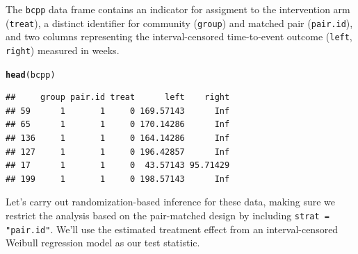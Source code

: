 \documentclass[12pt]{article}\usepackage[]{graphicx}\usepackage[]{color}
\makeatletter
\newcommand{\hlstd}[1]{\textcolor[rgb]{0.345,0.345,0.345}{#1}}%
\newcommand{\hlkwd}[1]{\textcolor[rgb]{0.737,0.353,0.396}{\textbf{#1}}}%
\newenvironment{kframe}{%
 \def\at@end@of@kframe{}%
 \ifinner\ifhmode%
  \def\at@end@of@kframe{\end{minipage}}%
  \begin{minipage}{\columnwidth}%
 \fi\fi%
 \def\FrameCommand##1{\hskip\@totalleftmargin \hskip-\fboxsep
 \colorbox{shadecolor}{##1}\hskip-\fboxsep
     \hskip-\linewidth \hskip-\@totalleftmargin \hskip\columnwidth}%
 \MakeFramed {\advance\hsize-\width
   \@totalleftmargin\z@ \linewidth\hsize
   \@setminipage}}%
 {\par\unskip\endMakeFramed%
 \at@end@of@kframe}
\newenvironment{knitrout}{}{} %
\makeatother
\begin{document}
The \texttt{bcpp} data frame contains an indicator for assigment to the intervention arm (\texttt{treat}), a distinct identifier for community (\texttt{group}) and matched pair (\texttt{pair.id}), and two columns representing the interval-censored time-to-event outcome (\texttt{left}, \texttt{right}) measured in weeks.
\begin{knitrout}
\color{fgcolor}\begin{kframe}
\begin{alltt}
\hlkwd{head}\hlstd{(bcpp)}
\end{alltt}
\begin{verbatim}
##     group pair.id treat      left    right
## 59      1       1     0 169.57143      Inf
## 65      1       1     0 170.14286      Inf
## 136     1       1     0 164.14286      Inf
## 127     1       1     0 196.42857      Inf
## 17      1       1     0  43.57143 95.71429
## 199     1       1     0 198.57143      Inf
\end{verbatim}
\end{kframe}
\end{knitrout}
Let's carry out randomization-based inference for these data, making sure we restrict the analysis based on the pair-matched design by including \texttt{strat = "pair.id"}. We'll use the estimated treatment effect from an interval-censored Weibull regression model as our test statistic.
\end{document}

